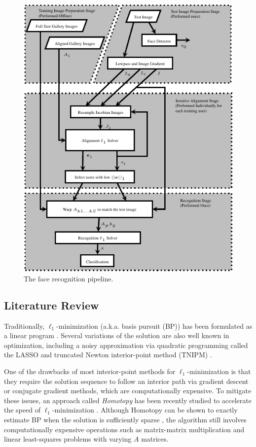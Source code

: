 \begin{figure}
\centering
\includegraphics[scale=1]{figures_ijcb/pipeline_simplified.pdf}
\caption{The face recognition pipeline.  }
\label{fig:pipeline}
\end{figure}


\subsection{Literature Review} 
Traditionally, $\ell_1$-minimization (a.k.a.
basis pursuit (BP)) has been formulated as a linear program
\cite{ChenS2001-SIAM}. Several variations of the solution are also well known
in optimization, including a noisy approximation via quadratic programming
called the LASSO \cite{TibshiraniR1996} and truncated Newton interior-point
method (TNIPM) \cite{KimS2007}.

One of the drawbacks of most interior-point methods for $\ell_1$-minimization is that they require the solution sequence to follow an
interior path via gradient descent or conjugate gradient methods, which are computationally expensive.
To mitigate these issues, an approach called \emph{Homotopy} has been recently studied to accelerate the
speed of $\ell_1$-minimization \cite{OsborneM2000,EfronB2004,MalioutovD2005,DonohoD2006}.
Although Homotopy can be shown to exactly estimate BP when the solution is
sufficiently sparse \cite{DonohoD2006}, the algorithm still involves
computationally expensive operations such as matrix-matrix multiplication and
linear least-squares problems with varying $A$
matrices.

